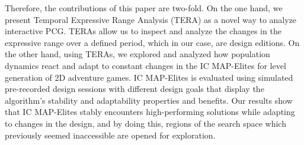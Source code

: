 Therefore, the contributions of this paper are two-fold. On the one hand, we present Temporal Expressive Range Analysis (TERA) as a novel way to analyze interactive PCG. TERAs allow us to inspect and analyze the changes in the expressive range over a defined period, which in our case, are design editions. On the other hand, using TERAs, we explored and analyzed how population dynamics react and adapt to constant changes in the IC MAP-Elites for level generation of 2D adventure games. IC MAP-Elites is evaluated using simulated pre-recorded design sessions with different design goals that display the algorithm's stability and adaptability properties and benefits. Our results show that IC MAP-Elites stably encounters high-performing solutions while adapting to changes in the design, and by doing this, regions of the search space which previously seemed inaccessible are opened for exploration.






